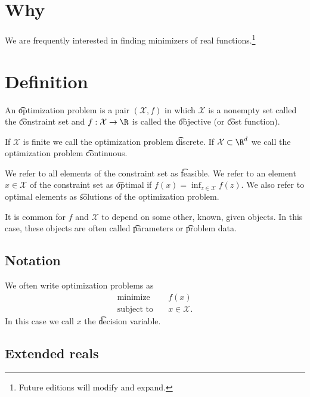 

\section*{Why}

We are frequently interested in finding minimizers of real functions.\footnote{Future editions will modify and expand.}

\section*{Definition}

An \t{optimization problem} is a pair $(\mathcal{X} , f)$ in which $\mathcal{X} $ is a nonempty set called the \t{constraint set} and $f: \mathcal{X}  \to \R $ is called the \t{objective} (or \t{cost function}).

If $\mathcal{X} $ is finite we call the optimization problem \t{discrete}.
If $\mathcal{X}  \subset \R ^d$ we call the optimization problem \t{continuous}.

We refer to all elements of the constraint set as \t{feasible}.
We refer to an element $x \in \mathcal{X} $ of the constraint set as \t{optimal} if $f(x) = \inf_{z \in \mathcal{X} }f(z)$.
We also refer to optimal elements as \t{solutions} of the optimization problem.

It is common for $f$ and $\mathcal{X} $ to depend on some other, known, given objects.
In this case, these objects are often called \t{parameters} or \t{problem data}.

\subsection*{Notation}

We often write optimization problems as
\[
\begin{aligned}
\text{minimize}\quad & f(x) \\
\text{subject to}\quad & x \in \mathcal{X} .
\end{aligned}
\]
In this case we call $x$ the \t{decision variable}.

\subsection*{Extended reals}

